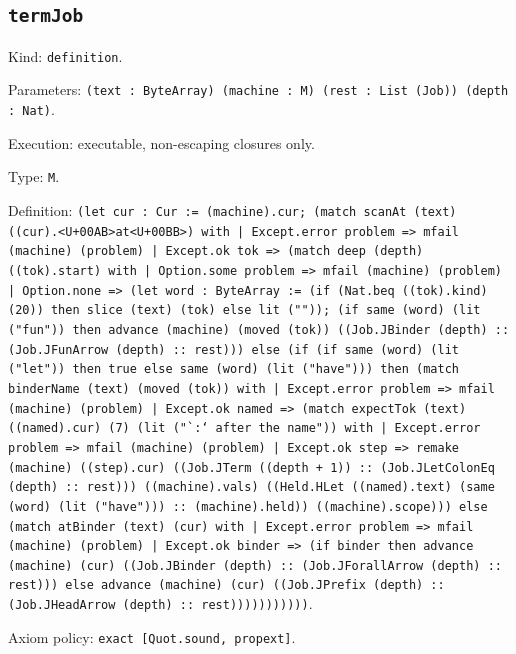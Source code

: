 \documentclass[11pt]{article}
\begin{document}
\subsection*{\texttt{termJob}}
\noindent Kind: \texttt{definition}.\par
\noindent Parameters: \texttt{(text : ByteArray) (machine : M) (rest : List (Job)) (depth : Nat)}.\par
\noindent Execution: executable, non-escaping closures only.\par
\noindent Type: \texttt{M}.\par
\noindent Definition: \texttt{(let cur : Cur := (machine).cur; (match scanAt (text) ((cur).<U+00AB>at<U+00BB>) with | Except.error problem => mfail (machine) (problem) | Except.ok tok => (match deep (depth) ((tok).start) with | Option.some problem => mfail (machine) (problem) | Option.none => (let word : ByteArray := (if (Nat.beq ((tok).kind) (20)) then slice (text) (tok) else lit ("")); (if same (word) (lit ("fun")) then advance (machine) (moved (tok)) ((Job.JBinder (depth) :: (Job.JFunArrow (depth) :: rest))) else (if (if same (word) (lit ("let")) then true else same (word) (lit ("have"))) then (match binderName (text) (moved (tok)) with | Except.error problem => mfail (machine) (problem) | Except.ok named => (match expectTok (text) ((named).cur) (7) (lit ("`:` after the name")) with | Except.error problem => mfail (machine) (problem) | Except.ok step => remake (machine) ((step).cur) ((Job.JTerm ((depth + 1)) :: (Job.JLetColonEq (depth) :: rest))) ((machine).vals) ((Held.HLet ((named).text) (same (word) (lit ("have"))) :: (machine).held)) ((machine).scope))) else (match atBinder (text) (cur) with | Except.error problem => mfail (machine) (problem) | Except.ok binder => (if binder then advance (machine) (cur) ((Job.JBinder (depth) :: (Job.JForallArrow (depth) :: rest))) else advance (machine) (cur) ((Job.JPrefix (depth) :: (Job.JHeadArrow (depth) :: rest)))))))))))}.\par
\noindent Axiom policy: \texttt{exact [Quot.sound, propext]}.\par
\end{document}
